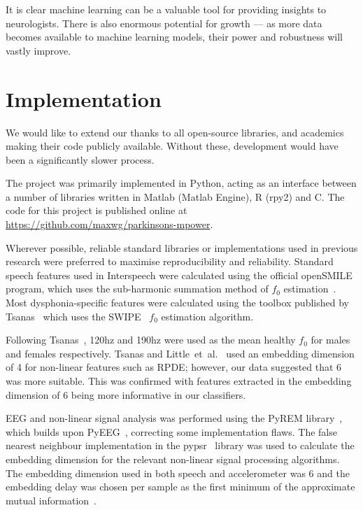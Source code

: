 \documentclass[12pt, twoside]{book}
\begin{document}
It is clear machine learning can be a valuable tool for providing insights to neurologists. There is also enormous potential for growth --- as more data becomes available to machine learning models, their power and robustness will vastly improve. 


\newpage
\section{Implementation}
\label{implementation}
We would like to extend our thanks to all open-source libraries, and academics making their code publicly available. Without these, development would have been a significantly slower process. 

The project was primarily implemented in Python, acting as an interface between a number of libraries written in Matlab (Matlab Engine), R (rpy2) and C. The code for this project is published online at \url{https://github.com/maxwg/parkinsons-mpower}.

Wherever possible, reliable standard libraries or implementations used in previous research were preferred to maximise reproducibility and reliability. Standard speech features used in Interspeech were calculated using the official openSMILE~\cite{opensmile} program, which uses the sub-harmonic summation method of $f_0$ estimation~\cite{shs}. Most dysphonia-specific features were calculated using the toolbox published by Tsanas~\cite{spoverview} which uses the SWIPE~\cite{camacho2007swipe,f0estimation} $f_0$ estimation algorithm. 

Following Tsanas~\cite{spoverview}, 120hz and 190hz were used as the mean healthy $f_0$ for males and females respectively. Tsanas and Little~et~al.~\cite{splittlenonlinear2007} used an embedding dimension of 4 for non-linear features such as RPDE; however, our data suggested that 6 was more suitable. This was confirmed with features extracted in the embedding dimension of 6 being more informative in our classifiers. 

EEG and non-linear signal analysis was performed using the PyREM library~\cite{pyrem}, which builds upon PyEEG~\cite{pyeeg}, correcting some implementation flaws. The false nearest neighbour implementation in the pypsr~\cite{pypsr} library was used to calculate the embedding dimension for the relevant non-linear signal processing algorithms. The embedding dimension used in both speech and accelerometer was 6 and the embedding delay was chosen per sample as the first minimum of the approximate mutual information~\cite{rosenstein1993practicallyapunov}.
 
\end{document}
